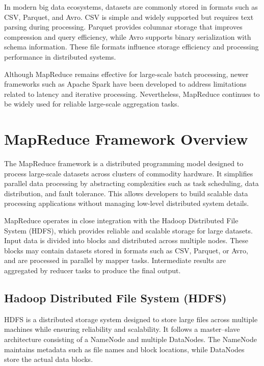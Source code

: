 \documentclass[12pt,a4paper]{report}
\begin{document}
In modern big data ecosystems, datasets are commonly stored in formats such as CSV,
Parquet, and Avro. CSV is simple and widely supported but requires text parsing during
processing. Parquet provides columnar storage that improves compression and query
efficiency, while Avro supports binary serialization with schema information. These file
formats influence storage efficiency and processing performance in distributed systems.

Although MapReduce remains effective for large-scale batch processing, newer frameworks
such as Apache Spark have been developed to address limitations related to latency and
iterative processing. Nevertheless, MapReduce continues to be widely used for reliable
large-scale aggregation tasks.
\clearpage
\section{MapReduce Framework Overview}

The MapReduce framework is a distributed programming model designed to process
large-scale datasets across clusters of commodity hardware. It simplifies parallel data
processing by abstracting complexities such as task scheduling, data distribution, and
fault tolerance. This allows developers to build scalable data processing applications
without managing low-level distributed system details.

MapReduce operates in close integration with the Hadoop Distributed File System
(HDFS), which provides reliable and scalable storage for large datasets. Input data is
divided into blocks and distributed across multiple nodes. These blocks may contain
datasets stored in formats such as CSV, Parquet, or Avro, and are processed in parallel
by mapper tasks. Intermediate results are aggregated by reducer tasks to produce the
final output.


\subsection{Hadoop Distributed File System (HDFS)}

HDFS is a distributed storage system designed to store large files across multiple
machines while ensuring reliability and scalability. It follows a master–slave architecture
consisting of a NameNode and multiple DataNodes. The NameNode maintains metadata
such as file names and block locations, while DataNodes store the actual data blocks.
\end{document}
